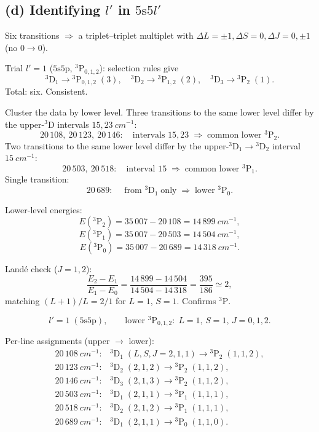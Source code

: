 \documentclass[11pt]{article}
\begin{document}
\subsection*{(d) Identifying $l'$ in $5\mathrm{s}5l'$}

Six transitions $\Rightarrow$ a triplet--triplet multiplet with $\Delta L=\pm1,\Delta S=0,\Delta J=0,\pm1$ (no $0\!\to\!0$).

Trial $l'=1$ ($5\mathrm{s}5\mathrm{p}$, ${}^{3}\!\mathrm{P}_{0,1,2}$): selection rules give
\[
{}^{3}\!\mathrm{D}_{1}\!\to\!{}^{3}\!\mathrm{P}_{0,1,2}\;(3),\quad
{}^{3}\!\mathrm{D}_{2}\!\to\!{}^{3}\!\mathrm{P}_{1,2}\;(2),\quad
{}^{3}\!\mathrm{D}_{3}\!\to\!{}^{3}\!\mathrm{P}_{2}\;(1).
\]
Total: six. Consistent.

Cluster the data by lower level. Three transitions to the same lower level differ by the upper-${}^{3}\!\mathrm{D}$ intervals $15,23\ \si{cm^{-1}}$:
\[
20\,108,\ 20\,123,\ 20\,146:\quad\text{intervals }15,23\;\Rightarrow\;\text{common lower }{}^{3}\!\mathrm{P}_{2}.
\]
Two transitions to the same lower level differ by the upper-${}^{3}\!\mathrm{D}_{1}\!\to\!{}^{3}\!\mathrm{D}_{2}$ interval $15\ \si{cm^{-1}}$:
\[
20\,503,\ 20\,518:\quad\text{interval }15\;\Rightarrow\;\text{common lower }{}^{3}\!\mathrm{P}_{1}.
\]
Single transition:
\[
20\,689:\quad\;\text{from }{}^{3}\!\mathrm{D}_{1}\;\text{only}\;\Rightarrow\;\text{lower }{}^{3}\!\mathrm{P}_{0}.
\]

Lower-level energies:
\[
E({}^{3}\!\mathrm{P}_{2})=35\,007-20\,108=14\,899\ \si{cm^{-1}},
\]
\[
E({}^{3}\!\mathrm{P}_{1})=35\,007-20\,503=14\,504\ \si{cm^{-1}},
\]
\[
E({}^{3}\!\mathrm{P}_{0})=35\,007-20\,689=14\,318\ \si{cm^{-1}}.
\]

Land\'e check ($J=1,2$):
\[
\frac{E_{2}-E_{1}}{E_{1}-E_{0}}=\frac{14\,899-14\,504}{14\,504-14\,318}=\frac{395}{186}\simeq 2,
\]
matching $(L+1)/L=2/1$ for $L=1$, $S=1$. Confirms ${}^{3}\!\mathrm{P}$.

\[
\boxed{\;l'=1\;(5\mathrm{s}5\mathrm{p}),\qquad\text{lower }{}^{3}\!\mathrm{P}_{0,1,2}:\;L=1,\,S=1,\,J=0,1,2.\;}
\]

Per-line assignments (upper $\to$ lower):
\[
\boxed{\;
\begin{array}{ll}
20\,108\ \si{cm^{-1}}:& {}^{3}\!\mathrm{D}_{1}\;(L,S,J=2,1,1)\to{}^{3}\!\mathrm{P}_{2}\;(1,1,2),\\
20\,123\ \si{cm^{-1}}:& {}^{3}\!\mathrm{D}_{2}\;(2,1,2)\to{}^{3}\!\mathrm{P}_{2}\;(1,1,2),\\
20\,146\ \si{cm^{-1}}:& {}^{3}\!\mathrm{D}_{3}\;(2,1,3)\to{}^{3}\!\mathrm{P}_{2}\;(1,1,2),\\
20\,503\ \si{cm^{-1}}:& {}^{3}\!\mathrm{D}_{1}\;(2,1,1)\to{}^{3}\!\mathrm{P}_{1}\;(1,1,1),\\
20\,518\ \si{cm^{-1}}:& {}^{3}\!\mathrm{D}_{2}\;(2,1,2)\to{}^{3}\!\mathrm{P}_{1}\;(1,1,1),\\
20\,689\ \si{cm^{-1}}:& {}^{3}\!\mathrm{D}_{1}\;(2,1,1)\to{}^{3}\!\mathrm{P}_{0}\;(1,1,0).
\end{array}\;}
\]
\end{document}
